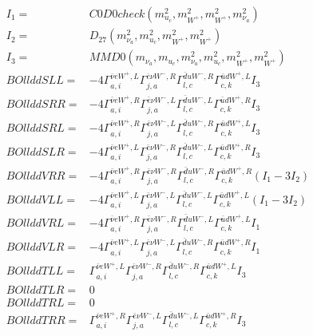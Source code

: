 \documentclass[A4,landscape]{article}
\begin{document}
\begin{align} 
I_1 = & C0D0check(m^2_{u_{{c}}}, m^2_{W^+}, m^2_{W^+}, m^2_{\nu_{{a}}}) \\ 
I_2 = & D_{27}(m^2_{\nu_{{a}}}, m^2_{u_{{c}}}, m^2_{W^+}, m^2_{W^+}) \\ 
I_3 = & MMD0(m_{\nu_{{a}}}, m_{u_{{c}}}, m^2_{\nu_{{a}}}, m^2_{u_{{c}}}, m^2_{W^+}, m^2_{W^+}) \\ 
  BOllddSLL= & -4  \Gamma^{\bar{\nu}e W^+ ,L}_{a, i} \Gamma^{\bar{e}\nu W^-,R}_{j, a} \Gamma^{\bar{d}u W^-,R}_{l, c} \Gamma^{\bar{u}d W^+ ,L}_{c, k} I_3 \\ 
  BOllddSRR= & -4  \Gamma^{\bar{\nu}e W^+ ,R}_{a, i} \Gamma^{\bar{e}\nu W^-,L}_{j, a} \Gamma^{\bar{d}u W^-,L}_{l, c} \Gamma^{\bar{u}d W^+ ,R}_{c, k} I_3 \\ 
  BOllddSRL= & -4  \Gamma^{\bar{\nu}e W^+ ,R}_{a, i} \Gamma^{\bar{e}\nu W^-,L}_{j, a} \Gamma^{\bar{d}u W^-,R}_{l, c} \Gamma^{\bar{u}d W^+ ,L}_{c, k} I_3 \\ 
  BOllddSLR= & -4  \Gamma^{\bar{\nu}e W^+ ,L}_{a, i} \Gamma^{\bar{e}\nu W^-,R}_{j, a} \Gamma^{\bar{d}u W^-,L}_{l, c} \Gamma^{\bar{u}d W^+ ,R}_{c, k} I_3 \\ 
  BOllddVRR= & -4  \Gamma^{\bar{\nu}e W^+ ,R}_{a, i} \Gamma^{\bar{e}\nu W^-,R}_{j, a} \Gamma^{\bar{d}u W^-,R}_{l, c} \Gamma^{\bar{u}d W^+ ,R}_{c, k} (I_1 - 3 I_2) \\ 
  BOllddVLL= & -4  \Gamma^{\bar{\nu}e W^+ ,L}_{a, i} \Gamma^{\bar{e}\nu W^-,L}_{j, a} \Gamma^{\bar{d}u W^-,L}_{l, c} \Gamma^{\bar{u}d W^+ ,L}_{c, k} (I_1 - 3 I_2) \\ 
  BOllddVRL= & -4  \Gamma^{\bar{\nu}e W^+ ,R}_{a, i} \Gamma^{\bar{e}\nu W^-,R}_{j, a} \Gamma^{\bar{d}u W^-,L}_{l, c} \Gamma^{\bar{u}d W^+ ,L}_{c, k} I_1 \\ 
  BOllddVLR= & -4  \Gamma^{\bar{\nu}e W^+ ,L}_{a, i} \Gamma^{\bar{e}\nu W^-,L}_{j, a} \Gamma^{\bar{d}u W^-,R}_{l, c} \Gamma^{\bar{u}d W^+ ,R}_{c, k} I_1 \\ 
  BOllddTLL= &  \Gamma^{\bar{\nu}e W^+ ,L}_{a, i} \Gamma^{\bar{e}\nu W^-,R}_{j, a} \Gamma^{\bar{d}u W^-,R}_{l, c} \Gamma^{\bar{u}d W^+ ,L}_{c, k} I_3 \\ 
  BOllddTLR= & 0 \\ 
  BOllddTRL= & 0 \\ 
  BOllddTRR= &  \Gamma^{\bar{\nu}e W^+ ,R}_{a, i} \Gamma^{\bar{e}\nu W^-,L}_{j, a} \Gamma^{\bar{d}u W^-,L}_{l, c} \Gamma^{\bar{u}d W^+ ,R}_{c, k} I_3 \\ 
\end{align} 
\end{document}

